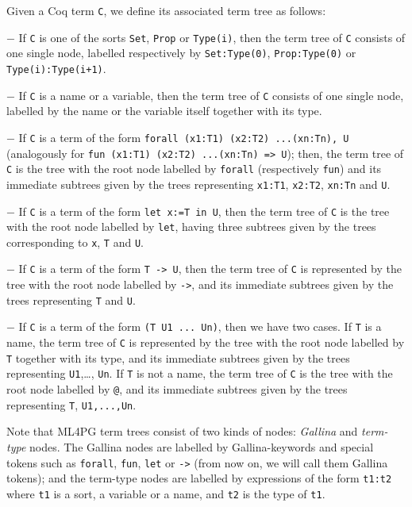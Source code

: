 \begin{definition}\label{def:ml4pgtermtree}
Given a Coq term \lstinline?C?, we define its associated term tree as follows:

$-$ If \lstinline?C? is one of the sorts \lstinline?Set?, \lstinline?Prop? or \lstinline?Type(i)?, then the term tree of 
 \lstinline?C? consists of one single node, labelled respectively by \lstinline?Set:Type(0)?, \lstinline?Prop:Type(0)? or \lstinline?Type(i):Type(i+1)?.
 
$-$ If \lstinline?C? is a name or a variable, then 
 the term tree of \lstinline?C? consists of one single node, labelled by the name or the variable itself together with its type.
 
$-$ If \lstinline?C? is a term of the form \lstinline?forall (x1:T1) (x2:T2) ...(xn:Tn), U? (analogously for \lstinline?fun (x1:T1) (x2:T2) ...(xn:Tn) => U?); 
then, the term tree of \lstinline?C? is the tree with the root node labelled by \lstinline?forall? (respectively \lstinline?fun?) 
and its immediate subtrees given by the trees representing \lstinline?x1:T1?, \lstinline?x2:T2?, \lstinline?xn:Tn? and \lstinline?U?.

$-$ If \lstinline?C? is a term of the form \lstinline?let x:=T in U?, then the term tree of \lstinline?C? 
 is the tree with the root node labelled by \lstinline?let?, having three subtrees given by the trees corresponding to \lstinline?x?, \lstinline?T? and \lstinline?U?.
 
 
$-$ If \lstinline?C? is a term of the form  \lstinline?T -> U?, then  the term tree of \lstinline?C?  is represented by the tree with the root node labelled by 
\lstinline?->?, and its immediate subtrees given by the trees representing  \lstinline?T? and \lstinline?U?.

$-$ If \lstinline?C? is a term of the form  \lstinline?(T U1 ... Un)?, then we have two cases.
If \lstinline?T? is a name, the term tree of \lstinline?C?  is represented by 
the tree with the root node labelled by \lstinline?T? together with its type, and its immediate subtrees given by the trees
representing \lstinline?U1?,\ldots, \lstinline?Un?. If \lstinline?T? is not a  name, the term tree of \lstinline?C?
is the tree with the root node labelled by \lstinline?@?, and its immediate subtrees given by the trees 
representing \lstinline?T?, \lstinline?U1,...,Un?.


\end{definition}


Note that ML4PG term trees consist of two kinds of nodes: \emph{Gallina} and \emph{term-type} nodes. The Gallina nodes are 
labelled by Gallina-keywords and special tokens such as \lstinline?forall?, \lstinline?fun?, \lstinline?let? or \lstinline?->? (from now on, we will call them Gallina tokens); 
and the term-type nodes are labelled by expressions of the form \lstinline?t1:t2? where \lstinline?t1? is a sort, a variable or 
a name, and  \lstinline?t2? is the type of \lstinline?t1?.  



